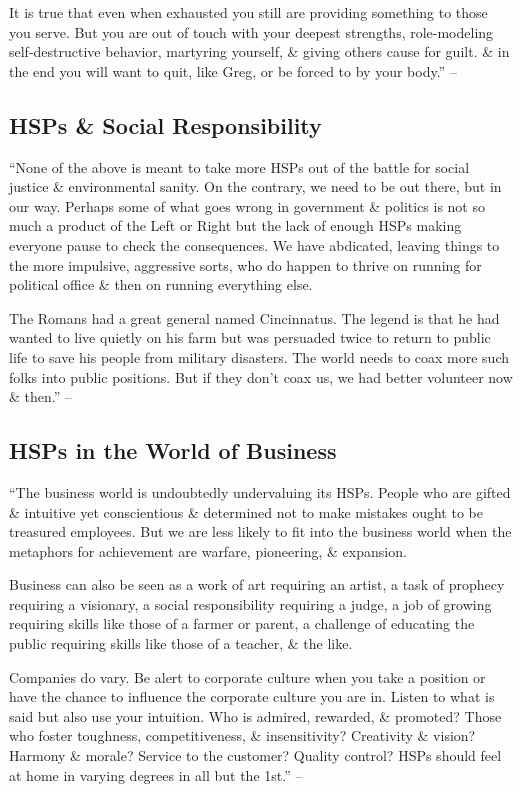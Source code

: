\documentclass{article}
\numberwithin{equation}{section}
\begin{document}
It is true that even when exhausted you still are providing something to those you serve. But you are out of touch with your deepest strengths, role-modeling self-destructive behavior, martyring yourself, \& giving others cause for guilt. \& in the end you will want to quit, like Greg, or be forced to by your body.'' -- \cite[pp. 157--158]{Aron2013}

\subsection{HSPs \& Social Responsibility}
``None of the above is meant to take more HSPs out of the battle for social justice \& environmental sanity. On the contrary, we need to be out there, but in our way. Perhaps some of what goes wrong in government \& politics is not so much a product of the Left or Right but the lack of enough HSPs making everyone pause to check the consequences. We have abdicated, leaving things to the more impulsive, aggressive sorts, who do happen to thrive on running for political office \& then on running everything else.

The Romans had a great general named Cincinnatus. The legend is that he had wanted to live quietly on his farm but was persuaded twice to return to public life to save his people from military disasters. The world needs to coax more such folks into public positions. But if they don't coax us, we had better volunteer now \& then.'' -- \cite[p. 159]{Aron2013}

\subsection{HSPs in the World of Business}
``The business world is undoubtedly undervaluing its HSPs. People who are gifted \& intuitive yet conscientious \& determined not to make mistakes ought to be treasured employees. But we are less likely to fit into the business world when the metaphors for achievement are warfare, pioneering, \& expansion.

Business can also be seen as a work of art requiring an artist, a task of prophecy requiring a visionary, a social responsibility requiring a judge, a job of growing requiring skills like those of a farmer or parent, a challenge of educating the public requiring skills like those of a teacher, \& the like.

Companies do vary. Be alert to corporate culture when you take a position or have the chance to influence the corporate culture you are in. Listen to what is said but also use your intuition. Who is admired, rewarded, \& promoted? Those who foster toughness, competitiveness, \& insensitivity? Creativity \& vision? Harmony \& morale? Service to the customer? Quality control? HSPs should feel at home in varying degrees in all but the 1st.'' -- \cite[p. 159]{Aron2013}
\end{document}
